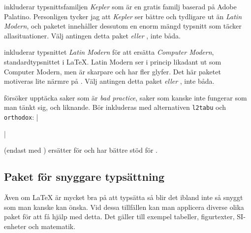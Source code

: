 \documentclass[10pt,../../a4.tex]{subfiles}
\begin{document}
\begin{description}
	\item[\pack{kpfonts}]
	inkluderar typsnittsfamiljen \emph{Kepler} som är en gratis familj
	baserad på Adobe Palatino. Personligen tycker jag att \emph{Kepler}
	ser bättre och tydligare ut än \emph{Latin Modern}, och paketet
	innehåller dessutom en enorm mängd typsnitt som täcker allasituationer.
	Välj antingen detta paket \emph{eller} , inte båda.
	
	\item[\pack{lmodern}]
	inkluderar typsnittet \emph{Latin Modern} för att ersätta
	\emph{Computer Modern}, standardtypsnittet i \LaTeX. Latin Modern ser
	i princip likadant ut som Computer Modern, men är skarpare och har
	fler glyfer. Det här paketet motiveras lite närmre på 
	. Välj antingen detta paket \emph{eller}
	, inte båda.
	
	\item[{\pack{nag}}]
	försöker upptäcka saker som är \emph{bad practice}, saker som kanske
	inte fungerar som man tänkt sig, och liknande. Bör inkluderas med
	alternativen \texttt{l2tabu} och \texttt{orthodox}:
	\latex|\usepackage[l2tabu,orthodox]{nag}|

	\item[{\pack{polyglossia}}] (endast med \XeTeX)
	ersätter  för \XeTeX{} och har bättre stöd för \UTF.
\end{description}

\subsection{Paket för snyggare typsättning}
Även om \LaTeX{} är mycket bra på att typsätta så blir det ibland inte
så snyggt som man kanske kan önska. Vid dessa tillfällen kan man
applicera diverse olika paket för att få hjälp med detta. Det gäller
till exempel tabeller, figurtexter, SI-enheter och matematik.
\end{document}

